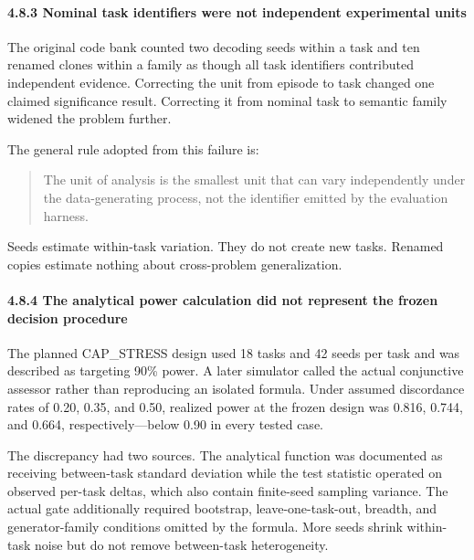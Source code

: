 \documentclass[
]{article}
\begin{document}
\paragraph{4.8.3 Nominal task identifiers were not independent
experimental
units}\label{483-nominal-task-identifiers-were-not-independent-experimental-units}

The original code bank counted two decoding seeds within a task and ten
renamed clones within a family as though all task identifiers
contributed independent evidence. Correcting the unit from episode to
task changed one claimed significance result. Correcting it from nominal
task to semantic family widened the problem further.

The general rule adopted from this failure is:

\begin{quote}
The unit of analysis is the smallest unit that can vary independently
under the data-generating process, not the identifier emitted by the
evaluation harness.
\end{quote}

Seeds estimate within-task variation. They do not create new tasks.
Renamed copies estimate nothing about cross-problem generalization.

\paragraph{4.8.4 The analytical power calculation did not represent the
frozen decision
procedure}\label{484-the-analytical-power-calculation-did-not-represent-the-frozen-decision-procedure}

The planned CAP\_STRESS design used 18 tasks and 42 seeds per task and
was described as targeting 90\% power. A later simulator called the
actual conjunctive assessor rather than reproducing an isolated formula.
Under assumed discordance rates of 0.20, 0.35, and 0.50, realized power
at the frozen design was 0.816, 0.744, and 0.664, respectively---below
0.90 in every tested case.

The discrepancy had two sources. The analytical function was documented
as receiving between-task standard deviation while the test statistic
operated on observed per-task deltas, which also contain finite-seed
sampling variance. The actual gate additionally required bootstrap,
leave-one-task-out, breadth, and generator-family conditions omitted by
the formula. More seeds shrink within-task noise but do not remove
between-task heterogeneity.
\end{document}
